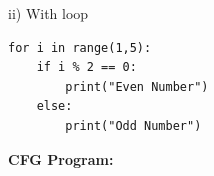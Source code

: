 \documentclass[12pt, letterpaper, twoside]{book}
\begin{document}
\begin{center}
\end{center}
\pagebreak
ii) With loop\\
\begin{lstlisting}
for i in range(1,5):
	if i % 2 == 0:
		print("Even Number")
	else:
		print("Odd Number")
\end{lstlisting}
\begin{flushleft}
\textbf{CFG Program:}
\end{flushleft}
\end{document}
